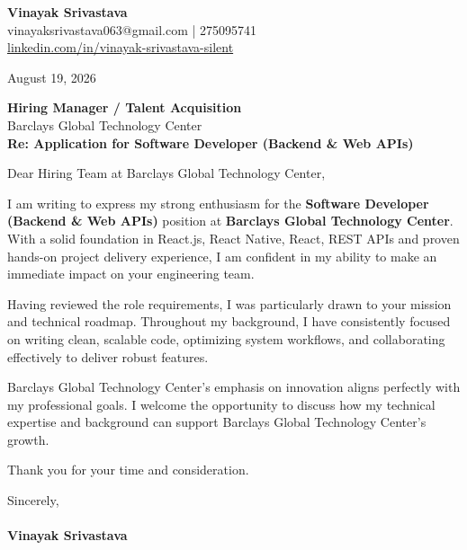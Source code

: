 \documentclass[11pt,a4paper]{article}
\begin{document}
\thispagestyle{empty}

{\Large \textbf{Vinayak Srivastava}}\\
vinayaksrivastava063@gmail.com | 275095741 \\
\url{linkedin.com/in/vinayak-srivastava-silent}

\vspace{1em}
\hfill August 19, 2026

\textbf{Hiring Manager / Talent Acquisition}\\
Barclays Global Technology Center\\

\vspace{1.5em}
\textbf{Re: Application for Software Developer (Backend & Web APIs)}

\vspace{1em}
Dear Hiring Team at Barclays Global Technology Center,

I am writing to express my strong enthusiasm for the \textbf{Software Developer (Backend & Web APIs)} position at \textbf{Barclays Global Technology Center}. With a solid foundation in React.js, React Native, React, REST APIs and proven hands-on project delivery experience, I am confident in my ability to make an immediate impact on your engineering team.

Having reviewed the role requirements, I was particularly drawn to your mission and technical roadmap. Throughout my background, I have consistently focused on writing clean, scalable code, optimizing system workflows, and collaborating effectively to deliver robust features.

Barclays Global Technology Center's emphasis on innovation aligns perfectly with my professional goals. I welcome the opportunity to discuss how my technical expertise and background can support Barclays Global Technology Center's growth.

Thank you for your time and consideration.

\vspace{1.5em}
Sincerely,\\
\vspace{1em}\\
\textbf{Vinayak Srivastava}
\end{document}
